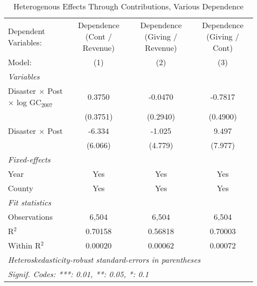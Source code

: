 
\begin{table}[htbp]
   \caption{Heterogenous Effects Through Contributions, Various Dependence}
   \centering
   \begin{adjustbox}{max width = \textwidth, center}
      \begin{tabular}{lccc}
         \tabularnewline \midrule \midrule
         Dependent Variables:                              & Dependence (Cont / Revenue) & Dependence (Giving / Revenue) & Dependence (Giving / Cont)\\  
         Model:                                            & (1)                         & (2)                           & (3)\\  
         \midrule
         \emph{Variables}\\
         Disaster $\times$ Post $\times$ log GC$_{2007}$   & 0.3750                      & -0.0470                       & -0.7817\\   
                                                           & (0.3751)                    & (0.2940)                      & (0.4900)\\   
         Disaster $\times$ Post                            & -6.334                      & -1.025                        & 9.497\\   
                                                           & (6.066)                     & (4.779)                       & (7.977)\\   
         \midrule
         \emph{Fixed-effects}\\
         Year                                              & Yes                         & Yes                           & Yes\\  
         County                                            & Yes                         & Yes                           & Yes\\  
         \midrule
         \emph{Fit statistics}\\
         Observations                                      & 6,504                       & 6,504                         & 6,504\\  
         R$^2$                                             & 0.70158                     & 0.56818                       & 0.70003\\  
         Within R$^2$                                      & 0.00020                     & 0.00062                       & 0.00072\\  
         \midrule \midrule
         \multicolumn{4}{l}{\emph{Heteroskedasticity-robust standard-errors in parentheses}}\\
         \multicolumn{4}{l}{\emph{Signif. Codes: ***: 0.01, **: 0.05, *: 0.1}}\\
      \end{tabular}
   \end{adjustbox}
\end{table}


